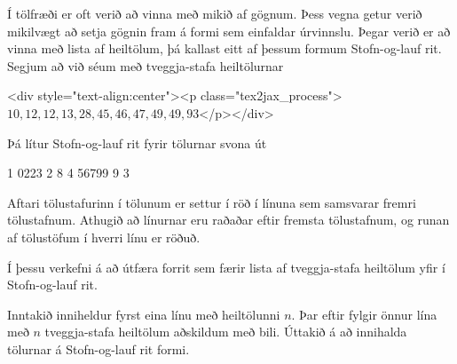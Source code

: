 
Í tölfræði er oft verið að vinna með mikið af gögnum. Þess vegna getur verið
mikilvægt að setja gögnin fram á formi sem einfaldar úrvinnslu. Þegar verið er
að vinna með lista af heiltölum, þá kallast eitt af þessum formum Stofn-og-lauf
rit. Segjum að við séum með tveggja-stafa heiltölurnar

<div style="text-align:center"><p class="tex2jax_process">$10, 12, 12, 13, 28, 45, 46, 47, 49, 49, 93$</p></div>

Þá lítur Stofn-og-lauf rit fyrir tölurnar svona út

    1 0223
    2 8
    4 56799
    9 3

Aftari tölustafurinn í tölunum er settur í röð í línuna sem samsvarar fremri
tölustafnum. Athugið að línurnar eru raðaðar eftir fremsta tölustafnum, og
runan af tölustöfum í hverri línu er röðuð.

Í þessu verkefni á að útfæra forrit sem færir lista af tveggja-stafa heiltölum
yfir í Stofn-og-lauf rit.

Inntakið inniheldur fyrst eina línu með heiltölunni $n$. Þar eftir fylgir önnur
lína með $n$ tveggja-stafa heiltölum aðskildum með bili. Úttakið á að innihalda
tölurnar á Stofn-og-lauf rit formi.

